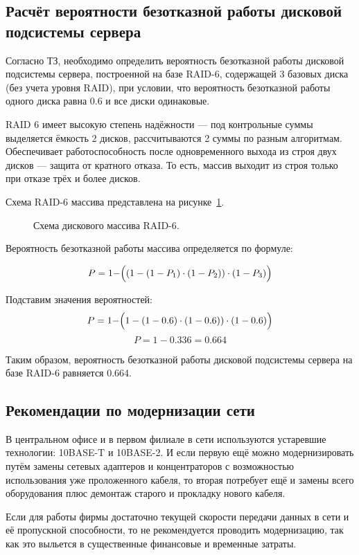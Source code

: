 \subsection{Расчёт вероятности безотказной работы дисковой подсистемы сервера}

Согласно ТЗ, необходимо определить вероятность безотказной работы дисковой подсистемы сервера, построенной на базе RAID-6, содержащей 3 базовых диска (без учета уровня RAID), при условии, что вероятность безотказной работы одного диска равна 0.6 и все диски одинаковые.\par\bigskip

RAID 6 имеет высокую степень надёжности — под контрольные суммы выделяется ёмкость 2 дисков, рассчитываются 2 суммы по разным алгоритмам. Обеспечивает работоспособность после одновременного выхода из строя двух дисков — защита от кратного отказа. То есть, массив выходит из строя только при отказе трёх и более дисков.\par\bigskip

Схема RAID-6 массива представлена на рисунке~\ref{pic:4_1_RAID-6}.

\begin{figure}[h]
\caption{Схема дискового массива RAID-6.}
\label{pic:4_1_RAID-6}
\end{figure}

Вероятность безотказной работы массива определяется по формуле:

$$P = 1 - \Bigr((1 - (1 - P_1)\cdot (1 - P_2))\cdot (1 - P_3)\Bigl)$$

Подставим значения вероятностей:
$$P = 1 - \Bigr(1 - (1 - 0.6)\cdot (1 - 0.6))\cdot (1 - 0.6)\Bigl)$$
$$P = 1 - 0.336 = 0.664$$

Таким образом, вероятность безотказной работы дисковой подсистемы сервера на базе RAID-6 равняется 0.664.

\subsection{Рекомендации по модернизации сети}

В центральном офисе и в первом филиале в сети используются устаревшие технологии: 10BASE-T и 10BASE-2. И если первую ещё можно модернизировать путём замены сетевых адаптеров и концентраторов с возможностью использования уже проложенного кабеля, то вторая потребует ещё и замены всего оборудования плюс демонтаж старого и прокладку нового кабеля.\par\bigskip

Если для работы фирмы достаточно текущей скорости передачи данных в сети и её пропускной способности, то не рекомендуется проводить модернизацию, так как это выльется в существенные финансовые и временные затраты.